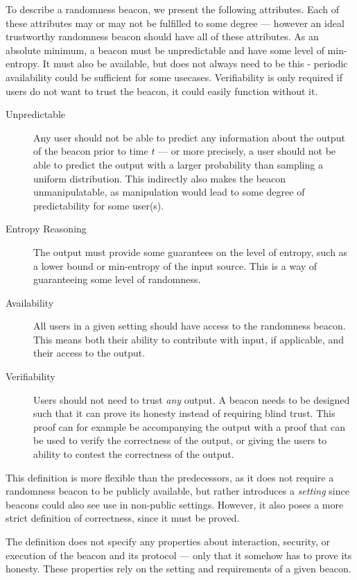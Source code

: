 To describe a randomness beacon, we present the following attributes.
Each of these attributes may or may not be fulfilled to some degree --- however an ideal trustworthy randomness beacon should have all of these attributes. As an absolute minimum, a beacon must be unpredictable and have some level of min-entropy. It must also be available, but does not always need to be this - periodic availability could be sufficient for some usecases. Verifiability is only required if users do not want to trust the beacon, it could easily function without it. 

\begin{description}
    \item[Unpredictable]
        Any user should not be able to predict any information about the output of the beacon prior to time $t$ --- or more precisely, a user should not be able to predict the output with a larger probability than sampling a uniform distribution.
        This indirectly also makes the beacon unmanipulatable, as manipulation would lead to some degree of predictability for some user(s).
    \item[Entropy Reasoning]
		The output must provide some guarantees on the level of entropy, such as a lower bound or min-entropy of the input source.
        This is a way of guaranteeing some level of randomness.
    \item[Availability]
        All users in a given setting should have access to the randomness beacon.
        This means both their ability to contribute with input, if applicable, and their access to the output.
    \item[Verifiability]
        Users should not need to trust \emph{any} output.
        A beacon needs to be designed such that it can prove its honesty instead of requiring blind trust.
        This proof can for example be accompanying the output with a proof that can be used to verify the correctness of the output, or giving the users to ability to contest the correctness of the output.
\end{description}

This definition is more flexible than the predecessors, as it does not require a randomness beacon to be publicly available, but rather introduces a \emph{setting} since beacons could also see use in non-public settings.
However, it also poses a more strict definition of correctness, since it must be proved.

The definition does not specify any properties about interaction, security, or execution of the beacon and its protocol --- only that it somehow has to prove its honesty.
These properties rely on the setting and requirements of a given beacon.
